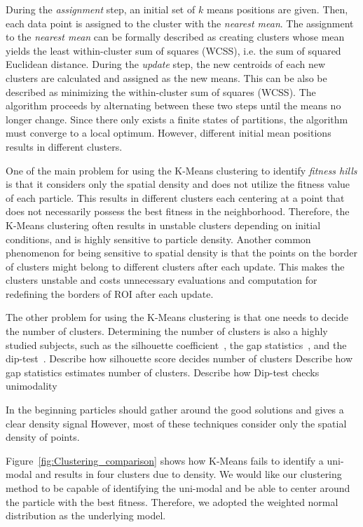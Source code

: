 During the \textit{assignment} step, an initial set of $k$ means positions are given.
Then, each data point is assigned to the cluster with the \textit{nearest mean}.
The assignment to the \textit{nearest mean} can be formally described 
as creating clusters whose mean yields the least within-cluster sum of squares (WCSS), i.e. the sum of squared Euclidean distance.
During the \textit{update} step, the new centroids of each new clusters are calculated and assigned as the new means.
This can be also be described as minimizing the within-cluster sum of squares (WCSS).
The algorithm proceeds by alternating between these two steps until the means no longer change.
Since there only exists a finite states of partitions, the algorithm must converge to a local optimum.
However, different initial mean positions results in different clusters.

One of the main problem for using the K-Means clustering to identify \textit{fitness hills} is that
it considers only the spatial density and does not utilize the fitness value of each particle.
This results in different clusters each centering at a point that does not necessarily possess the best fitness in the neighborhood.
Therefore, the K-Means clustering often results in unstable clusters depending on initial conditions, and is highly sensitive to particle density.
Another common phenomenon for being sensitive to spatial density is that 
the points on the border of clusters might belong to different clusters after each update.
This makes the clusters unstable and costs unnecessary evaluations and computation for redefining the borders of ROI after each update. 

The other problem for using the K-Means clustering is that one needs to decide the number of clusters.
Determining the number of clusters is also a highly studied subjects, 
such as the silhouette coefficient~\cite{}, the gap statistics~\cite{}, and the dip-test~\cite{}.
Describe how silhouette score decides number of clusters 
Describe how gap statistics estimates number of clusters.
Describe how Dip-test checks unimodality

In the beginning particles should gather around the good solutions and gives a clear density signal
However, most of these techniques consider only the spatial density of points.




Figure~\ref{fig:Clustering_comparison} shows how K-Means fails to identify a uni-modal and results in four clusters due to density.
We would like our clustering method to be capable of identifying the uni-modal and be able to center around the particle with the best fitness.
Therefore, we adopted the weighted normal distribution as the underlying model. 


